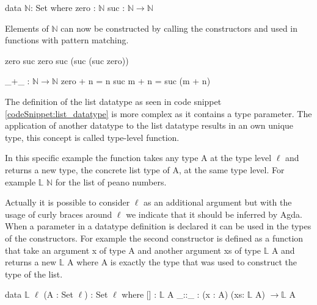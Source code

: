 \begin{codesnippet}[mathescape=true, caption={Definition of the peano natural numbers datatype in Agda}, label={codeSnippet:natural_number}]
data $\mathbb{N}$: Set where
  zero : $\mathbb{N}$
  suc : $\mathbb{N} \rightarrow \mathbb{N}$
\end{codesnippet}

Elements of $\mathbb{N}$ can now be constructed by calling the constructors and used in functions with pattern matching.
\begin{codesnippet}[mathescape=true, caption={Some peano numbers}, label={codeSnippet:natural_number_constructor}]
zero
suc zero
suc (suc (suc zero))
\end{codesnippet}
\begin{codesnippet}[mathescape=true, caption={Peano numbers addition}, label={codeSnippet:natural_number_addition}]
_+_ : $\mathbb{N} \rightarrow \mathbb{N}$
zero  + n = n
suc m + n = suc (m + n)
\end{codesnippet}


The definition of the list datatype as seen in code snippet \ref{codeSnippet:list_datatype} is more complex as it contains a type parameter. The application of another datatype to the list datatype results in an own unique type, this concept is called type-level function. 

In this specific example the function takes any type A at the type level $\ell$ and returns a new type, the concrete list type of A, at the same type level.
For example $\mathbb{L}$ $\mathbb{N}$ for the list of peano numbers.

Actually it is possible to consider $\ell$ as an additional argument but with the usage of curly braces around $\ell$ we indicate that it should be inferred by Agda.
When a parameter in a datatype definition is declared it can be used in the types of the constructors. 
For example the second constructor is defined as a function that take an argument x of type A and another argument xs of type $\mathbb{L}$ A and returns a new $\mathbb{L}$ A where A is exactly the type that was used to construct the type of the list.
\begin{codesnippet}[mathescape=true, caption={Definition of the list datatype in Agda}, label={codeSnippet:list_datatype}]
data $\mathbb{L}$ {$\ell$} (A : Set $\ell$) : Set $\ell$ where
  [] : $\mathbb{L}$ A
  _::_ : (x : A) (xs: $\mathbb{L}$ A) $\rightarrow \mathbb{L}$ A
\end{codesnippet}

